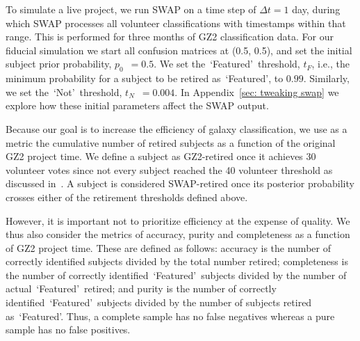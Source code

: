\documentclass[twocolumn]{aastex6}
\newcommand{\Pf}{$P_{F,0}$}
\newcommand{\Pn}{$P_{N,0}$}
\newcommand{\p}{$p_0$}
\newcommand{\tf}{$t_F$}
\newcommand{\tn}{$t_N$}
\newcommand{\feat}{`Featured'}
\newcommand{\notfeat}{`Not'}
\begin{document}
To simulate a live project, we run SWAP on a time step of $\Delta t = 1$ day, during 
which SWAP processes all volunteer classifications with timestamps within that range.
This is performed for three months of GZ2 classification data. 
For our fiducial  simulation we start all confusion matrices at (0.5, 0.5), and set the initial subject prior probability, \p~$= 0.5$. We set the~\feat~threshold, \tf, i.e., the minimum probability for a subject to be retired as~\feat, to $0.99$. Similarly, we set the~\notfeat~threshold, \tn~$= 0.004$. In Appendix~\ref{sec: tweaking swap}
we explore how these initial parameters affect the SWAP output.



Because our goal is to increase the efficiency of galaxy classification,
we use as a metric the cumulative number of retired subjects
as a function of the original GZ2 project time.
We define a subject as GZ2-retired once it achieves 30 volunteer votes since 
not every subject reached the 40 volunteer threshold as discussed in~\cite{Willett2013}. 
A subject is considered SWAP-retired once its posterior 
probability crosses either of the retirement thresholds defined above. 

However, it is important not to prioritize efficiency at the expense of quality. 
We thus also consider the metrics of accuracy, 
purity and completeness as a function of GZ2 project time.  These are 
defined as follows: accuracy is the number of correctly
identified subjects divided by the total number retired; completeness is the number of 
correctly identified~\feat~subjects divided by the number of actual~\feat~retired; 
and purity is the number of correctly identified~\feat~subjects divided by 
the number of subjects retired as~\feat. Thus, a complete sample has no false
negatives whereas a pure sample has no false positives. 
\end{document}

